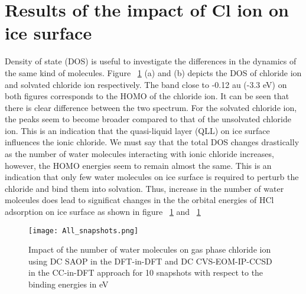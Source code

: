 \documentclass[a4paper,11pt]{report}
\begin{document}
\section{Results of the impact of Cl ion on ice surface}
Density of state (DOS) is useful to investigate the differences in the dynamics of the same kind of molecules. Figure ~\ref{figure55} (a) and (b) depicts the DOS of chloride ion and solvated chloride ion respectively. The band close to -0.12 au (-3.3 eV) on both figures corresponds to the HOMO of the chloride ion. It can be seen that there is clear difference between the two spectrum. For the solvated chloride ion, the peaks seem to become broader compared to that of the unsolvated chloride ion. This is an indication that the quasi-liquid layer (QLL) on ice surface influences the ionic chloride. We must say that the total DOS changes drastically as the number of water molecules interacting with ionic chloride increases, however, the HOMO energies seem to remain almost the same. This is an indication that only few water molecules on ice surface is required to perturb the chloride and bind them into solvation. Thus, increase in the number of water molceules does lead to significat changes in the the orbital energies of HCl adsorption on ice surface as shown in figure ~\ref{figure55} and ~\ref{figure55}

\begin{figure}[H]\large
\captionsetup{font=footnotesize}
\texttt{[image: All\_snapshots.png]}
\caption{Impact of the number of water molecules on gas phase chloride ion using DC SAOP in the DFT-in-DFT and DC CVS-EOM-IP-CCSD in the CC-in-DFT approach for 10 snapshots with respect to the binding energies in eV}
\label{figure55}
\end{figure}





\end{document}
